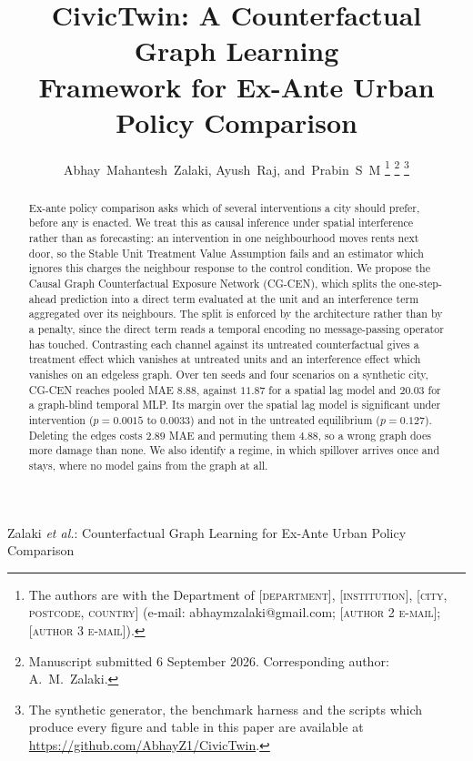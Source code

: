 \documentclass[journal]{IEEEtran}
\newcommand{\CGCEN}{CG\mbox{-}CEN}
\begin{document}
\title{CivicTwin: A Counterfactual Graph Learning\\
Framework for Ex-Ante Urban Policy Comparison}

\author{Abhay~Mahantesh~Zalaki,
        Ayush~Raj,
        and~Prabin~S~M%
\thanks{The authors are with the Department of \textsc{[department]},
\textsc{[institution]}, \textsc{[city, postcode, country]}
(e-mail: abhaymzalaki@gmail.com; \textsc{[author 2 e-mail]};
\textsc{[author 3 e-mail]}).}%
\thanks{Manuscript submitted 6 September 2026. Corresponding author:
A.~M.~Zalaki.}%
\thanks{The synthetic generator, the benchmark harness and the scripts which
produce every figure and table in this paper are available at
\url{https://github.com/AbhayZ1/CivicTwin}.}}

%
{Zalaki \MakeLowercase{\textit{et al.}}: Counterfactual Graph Learning for Ex-Ante Urban Policy Comparison}

\maketitle

\begin{abstract}
Ex-ante policy comparison asks which of several interventions a city should
prefer, before any is enacted. We treat this as causal inference under spatial
interference rather than as forecasting: an intervention in one neighbourhood
moves rents next door, so the Stable Unit Treatment Value Assumption fails and
an estimator which ignores this charges the neighbour response to the control
condition. We propose the Causal Graph Counterfactual Exposure Network
(\CGCEN{}), which splits the one-step-ahead prediction into a direct term
evaluated at the unit and an interference term aggregated over its neighbours.
The split is enforced by the architecture rather than by a penalty, since the
direct term reads a temporal encoding no message-passing operator has touched.
Contrasting each channel against its untreated counterfactual gives a treatment
effect which vanishes at untreated units and an interference effect which
vanishes on an edgeless graph. Over ten seeds and four scenarios on a synthetic
city, \CGCEN{} reaches pooled MAE $8.88$, against $11.87$ for a spatial lag
model and $20.03$ for a graph-blind temporal MLP. Its margin over the spatial
lag model is significant under intervention ($p = 0.0015$ to $0.0033$) and not
in the untreated equilibrium ($p = 0.127$). Deleting the edges costs $2.89$ MAE
and permuting them $4.88$, so a wrong graph does more damage than none. We also
identify a regime, in which spillover arrives once and stays, where no model
gains from the graph at all.
\end{abstract}
\end{document}
